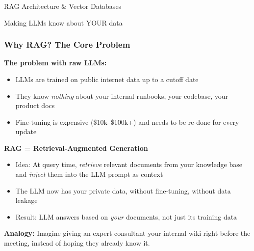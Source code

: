 \begin{frame}[fragile]\frametitle{}
\begin{center}
{\Large RAG Architecture \& Vector Databases}

{\small Making LLMs know about YOUR data}
\end{center}
\end{frame}

\begin{frame}[fragile]\frametitle{Why RAG? The Core Problem}
\textbf{The problem with raw LLMs:}
\begin{itemize}
\item LLMs are trained on public internet data up to a cutoff date
\item They know \textit{nothing} about your internal runbooks, your codebase, your product docs
\item Fine-tuning is expensive (\$10k--\$100k+) and needs to be re-done for every update
\end{itemize}

\textbf{RAG = Retrieval-Augmented Generation}
\begin{itemize}
\item Idea: At query time, \textit{retrieve} relevant documents from your knowledge base and \textit{inject} them into the LLM prompt as context
\item The LLM now has your private data, without fine-tuning, without data leakage
\item Result: LLM answers based on \textit{your} documents, not just its training data
\end{itemize}

\textbf{Analogy:} Imagine giving an expert consultant your internal wiki right before the meeting, instead of hoping they already know it.
\end{frame}

